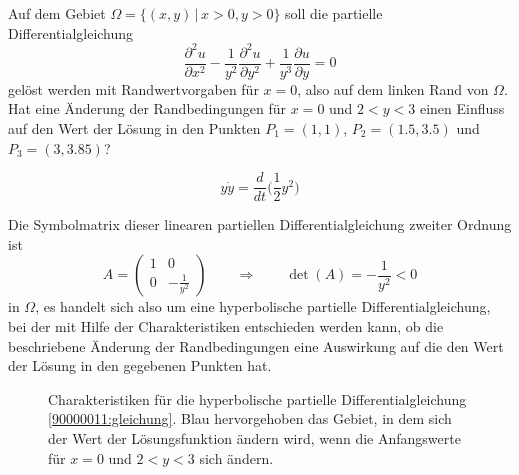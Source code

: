 Auf dem Gebiet $\Omega=\{(x,y)\,|\, x>0, y>0\}$ soll die partielle
Differentialgleichung
\begin{equation}
\frac{\partial^2 u}{\partial x^2}-\frac1{y^2}\frac{\partial^2 u}{\partial y^2} 
+
\frac1{y^3}\frac{\partial u}{\partial y}=0
\label{90000011:gleichung}
\end{equation}
gelöst werden mit Randwertvorgaben für $x=0$, also auf dem linken Rand von
$\Omega$.
Hat eine Änderung der Randbedingungen für $x=0$ und $2 < y<3$ einen
Einfluss auf den Wert der Lösung in den Punkten
$P_1=(1,1)$,
$P_2=(1.5,3.5)$ und
$P_3=(3,3.85)$?

\begin{hinweis}
\[
y\dot y=\frac{d}{dt}\bigl(
{\textstyle \frac12}y^2
\bigr)
\]
\end{hinweis}

\begin{loesung}
Die Symbolmatrix dieser linearen partiellen Differentialgleichung zweiter
Ordnung ist
\[
A=\begin{pmatrix}
1&0\\
0&-\frac1{y^2}
\end{pmatrix}
\qquad
\Rightarrow
\qquad
\det(A)=-\frac1{y^2}<0
\]
in $\Omega$, es handelt sich also um eine hyperbolische partielle
Differentialgleichung, bei der mit Hilfe der Charakteristiken entschieden
werden kann, ob die beschriebene Änderung der Randbedingungen eine 
Auswirkung auf die den Wert der Lösung in den gegebenen Punkten hat.
\begin{figure}
\begin{center}
\end{center}
\caption{Charakteristiken für die hyperbolische partielle
Differentialgleichung \eqref{90000011:gleichung}.
Blau hervorgehoben das Gebiet, in dem sich der Wert der Lösungsfunktion
ändern wird, wenn die Anfangswerte für $x=0$ und $2<y<3$ sich ändern.
\label{90000011:bild}}
\end{figure}


\end{loesung}
